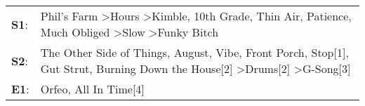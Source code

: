 \begin{supertabular}{p{0.03\textwidth}p{0.92\textwidth}}
 \textbf{S1}:  &      Phil's Farm\textsuperscript{} \textgreater \enspace Hours\textsuperscript{} \textgreater \enspace Kimble\textsuperscript{}, \enspace 10th Grade\textsuperscript{}, \enspace Thin Air\textsuperscript{}, \enspace Patience\textsuperscript{}, \enspace Much Obliged\textsuperscript{} \textgreater \enspace Slow\textsuperscript{} \textgreater \enspace Funky Bitch\textsuperscript{}  \enspace  \\
 \textbf{S2}:  &  The Other Side of Things\textsuperscript{}, \enspace August\textsuperscript{}, \enspace Vibe\textsuperscript{}, \enspace Front Porch\textsuperscript{}, \enspace Stop[1]\textsuperscript{}, \enspace Gut Strut\textsuperscript{}, \enspace Burning Down the House[2]\textsuperscript{} \textgreater \enspace Drums[2]\textsuperscript{} \textgreater \enspace G-Song[3]\textsuperscript{}  \enspace  \\
 \textbf{E1}:  &                                                                                                                                                                                                                                                                                                                         Orfeo\textsuperscript{}, \enspace All In Time[4]\textsuperscript{}  \enspace  \\
\end{supertabular}
